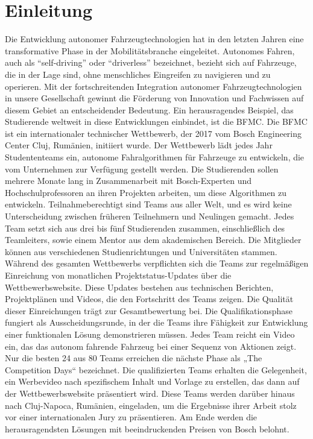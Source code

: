 \chapter{Einleitung}
Die Entwicklung autonomer Fahrzeugtechnologien hat in den letzten Jahren eine transformative Phase in der Mobilitätsbranche eingeleitet. Autonomes Fahren, auch als \enquote{self-driving} oder \enquote{driverless} bezeichnet, bezieht sich auf Fahrzeuge, die in der Lage sind, ohne menschliches Eingreifen zu navigieren und zu operieren. \cite{m1} Mit der fortschreitenden Integration autonomer Fahrzeugtechnologien in unsere Gesellschaft gewinnt die Förderung von Innovation und Fachwissen auf diesem Gebiet an entscheidender Bedeutung. Ein herausragendes Beispiel, das Studierende weltweit in diese Entwicklungen einbindet, ist die \gls{BFMC}. 
Die \gls{BFMC} ist ein internationaler technischer Wettbewerb, der 2017 vom Bosch Engineering Center Cluj, Rumänien, initiiert wurde. Der Wettbewerb lädt jedes Jahr Studententeams ein, autonome Fahralgorithmen für Fahrzeuge zu entwickeln, die vom Unternehmen zur Verfügung gestellt werden. Die Studierenden sollen mehrere Monate lang in Zusammenarbeit mit Bosch-Experten und Hochschulprofessoren an ihren Projekten arbeiten, um diese Algorithmen zu entwickeln. \cite{boschfumobility} Teilnahmeberechtigt sind Teams aus aller Welt, und es wird keine Unterscheidung zwischen früheren Teilnehmern und Neulingen gemacht. Jedes Team setzt sich aus drei bis fünf Studierenden zusammen, einschließlich des Teamleiters, sowie einem Mentor aus dem akademischen Bereich. Die Mitglieder können aus verschiedenen Studienrichtungen und Universitäten stammen. 
Während des gesamten Wettbewerbs verpflichten sich die Teams zur regelmäßigen Einreichung von monatlichen Projektstatus-Updates über die Wettbewerbswebsite. Diese Updates bestehen aus technischen Berichten, Projektplänen und Videos, die den Fortschritt des Teams zeigen. Die Qualität dieser Einreichungen trägt zur Gesamtbewertung bei. 
Die Qualifikationsphase fungiert als Ausscheidungsrunde, in der die Teams ihre Fähigkeit zur Entwicklung einer funktionalen Lösung demonstrieren müssen. Jedes Team reicht ein Video ein, das das autonom fahrende Fahrzeug bei einer Sequenz von Aktionen zeigt. Nur die besten 24 aus 80 Teams erreichen die nächste Phase als „The Competition Days“ bezeichnet. 
Die qualifizierten Teams erhalten die Gelegenheit, ein Werbevideo nach spezifischem Inhalt und Vorlage zu erstellen, das dann auf der Wettbewerbswebsite präsentiert wird.  Diese Teams werden darüber hinaus nach Cluj-Napoca, Rumänien, eingeladen, um die Ergebnisse ihrer Arbeit stolz vor einer internationalen Jury zu präsentieren. Am Ende werden die herausragendsten Lösungen mit beeindruckenden Preisen von Bosch belohnt.\cite{bfmc} 